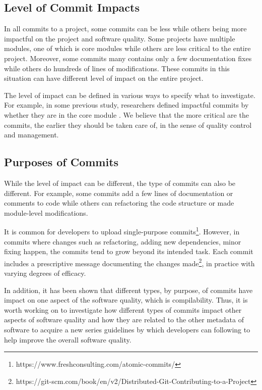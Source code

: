 \subsection{Level of Commit Impacts}
In all commits to a project, some commits can be less while others being more impactful on the project and software quality.
Some projects have multiple modules, one of which is core modules while others are less critical to the entire project. 
Moreover, some commits many contains only a few documentation fixes while others do hundreds of lines of modifications.
These commits in this situation can have different level of impact on the entire project.

The level of impact can be defined in various ways to specify what to investigate. For example, in some previous study, researchers defined impactful commits by whether they are in the core module \cite{pooyan_esem, pooyan_qrs}.
We believe that the more critical are the commits, the earlier they should be taken care of, in the sense of quality control and management. 


\subsection{Purposes of Commits}
While the level of impact can be different, the type of commits can also be different.
For example, some commits add a few lines of documentation or comments to code while others can refactoring the code structure or made module-level modifications.

It is common for developers to upload single-purpose commits\footnote{https://www.freshconsulting.com/atomic-commits/}. 
However, in commits where changes such as refactoring, adding new dependencies, minor fixing happen, the commits tend to grow beyond its intended task. 
Each commit includes a prescriptive message documenting the changes made\footnote{https://git-scm.com/book/en/v2/Distributed-Git-Contributing-to-a-Project}, in practice with varying degrees of efficacy. 

In addition, it has been shown that different types, by purpose, of commits have impact on one aspect of the software quality, which is compilability\cite{qrs2020}.
Thus, it is worth working on to investigate how different types of commits impact other aspects of software quality and how they are related to the other metadata of software to acquire a new series guidelines by which developers can following to help improve the overall software quality.

